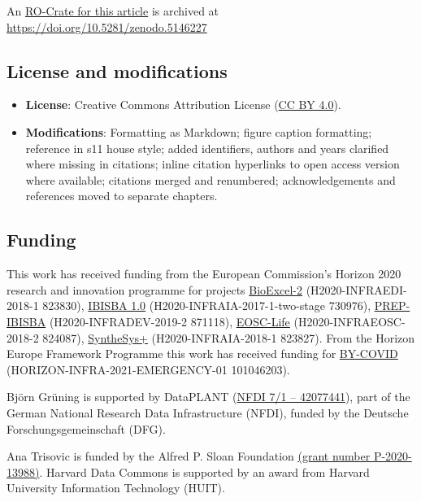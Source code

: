 An \href{https://w3id.org/ro/doi/10.5281/zenodo.5146227}{RO-Crate for
this article} is archived at
\url{https://doi.org/10.5281/zenodo.5146227}

\subsection*{License and modifications}

\begin{itemize}
\tightlist
\item
  \textbf{License}: Creative Commons Attribution License
  (\href{https://spdx.org/licenses/CC-BY-4.0}{CC BY 4.0}).
\item
  \textbf{Modifications}: Formatting as Markdown; figure caption
  formatting; reference in s11 house style; added identifiers, authors
  and years clarified where missing in citations; inline citation
  hyperlinks to open access version where available; citations merged and renumbered; 
  acknowledgements and references moved to separate chapters.
\end{itemize}


\subsection*{Funding}

This work has received funding from the European Commission's Horizon
2020 research and innovation programme for projects
\href{https://cordis.europa.eu/project/id/823830}{BioExcel-2}
(H2020-INFRAEDI-2018-1 823830),
\href{https://cordis.europa.eu/project/id/730976}{IBISBA 1.0}
(H2020-INFRAIA-2017-1-two-stage 730976),
\href{https://cordis.europa.eu/project/id/871118}{PREP-IBISBA}
(H2020-INFRADEV-2019-2 871118),
\href{https://cordis.europa.eu/project/id/824087}{EOSC-Life}
(H2020-INFRAEOSC-2018-2 824087),
\href{https://cordis.europa.eu/project/id/823827}{SyntheSys+}
(H2020-INFRAIA-2018-1 823827). From the Horizon Europe Framework
Programme this work has received funding for
\href{https://cordis.europa.eu/project/id/101046203}{BY-COVID}
(HORIZON-INFRA-2021-EMERGENCY-01 101046203).

Björn Grüning is supported by DataPLANT
(\href{https://gepris.dfg.de/gepris/projekt/442077441}{NFDI 7/1 --
42077441}), part of the German National Research Data Infrastructure
(NFDI), funded by the Deutsche Forschungsgemeinschaft (DFG).

Ana Trisovic is funded by the Alfred P. Sloan Foundation
\href{https://sloan.org/grant-detail/9555}{(grant number P-2020-13988)}.
Harvard Data Commons is supported by an award from Harvard University
Information Technology (HUIT).


